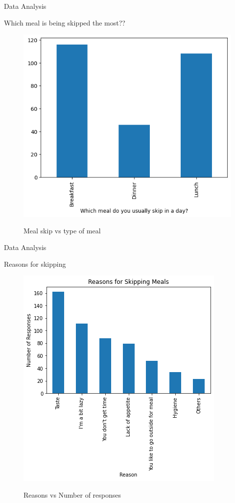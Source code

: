 \documentclass{beamer}
\begin{document}
\begin{frame}{Data Analysis}
\begin{block}{Which meal is being skipped the most??}
\begin{figure}
      \centering
    \caption{Meal skip vs type of meal }
    \includegraphics[scale = 0.5]{bar_timing_skip.png}  
    \label{bar_timing_skip}
\end{figure}
\end{block}
\end{frame}
\begin{frame}{Data Analysis}
\begin{block}{Reasons for skipping}
\begin{figure}
      \centering
    \caption{Reasons vs Number of responses }
    \includegraphics[scale = 0.42]{bar_reasons.png}  
    \label{bar_reasons}
\end{figure}
\end{block}
\end{frame}
\end{document}
